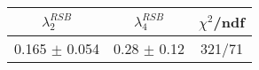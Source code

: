 \begin{tabular}{c|c||c}
$\lambda_{2}^{RSB}$ & $\lambda_4^{RSB}$ & $\chi^{2}$/ndf \\
\hline
0.165 $\pm$ 0.054 & 0.28 $\pm$ 0.12 & 321/71\\
\end{tabular}
